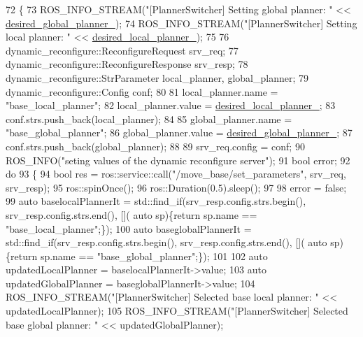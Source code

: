 \begin{DoxyCode}
72 \{
73   ROS\_INFO\_STREAM(\textcolor{stringliteral}{"[PlannerSwitcher] Setting global planner: "} << 
      \hyperlink{classcl__move__base__z_1_1PlannerSwitcher_aef047d3778b2993c1df146bbad43e03d}{desired\_global\_planner\_});
74   ROS\_INFO\_STREAM(\textcolor{stringliteral}{"[PlannerSwitcher] Setting local planner: "} << 
      \hyperlink{classcl__move__base__z_1_1PlannerSwitcher_a6cbf65f11bb69125f913caaabdf7b4cf}{desired\_local\_planner\_});
75 
76   dynamic\_reconfigure::ReconfigureRequest srv\_req;
77   dynamic\_reconfigure::ReconfigureResponse srv\_resp;
78   dynamic\_reconfigure::StrParameter local\_planner, global\_planner;
79   dynamic\_reconfigure::Config conf;
80 
81   local\_planner.name = \textcolor{stringliteral}{"base\_local\_planner"};
82   local\_planner.value = \hyperlink{classcl__move__base__z_1_1PlannerSwitcher_a6cbf65f11bb69125f913caaabdf7b4cf}{desired\_local\_planner\_};
83   conf.strs.push\_back(local\_planner);
84 
85   global\_planner.name = \textcolor{stringliteral}{"base\_global\_planner"};
86   global\_planner.value = \hyperlink{classcl__move__base__z_1_1PlannerSwitcher_aef047d3778b2993c1df146bbad43e03d}{desired\_global\_planner\_};
87   conf.strs.push\_back(global\_planner);
88 
89   srv\_req.config = conf;
90   ROS\_INFO(\textcolor{stringliteral}{"seting values of the dynamic reconfigure server"});
91   \textcolor{keywordtype}{bool} error;
92   \textcolor{keywordflow}{do}
93   \{
94     \textcolor{keywordtype}{bool} res = ros::service::call(\textcolor{stringliteral}{"/move\_base/set\_parameters"}, srv\_req, srv\_resp);
95     ros::spinOnce();
96     ros::Duration(0.5).sleep();
97     
98     error = \textcolor{keyword}{false};
99     \textcolor{keyword}{auto} baselocalPlannerIt = std::find\_if(srv\_resp.config.strs.begin(), srv\_resp.config.strs.end(), [](\textcolor{keyword}{
      auto} sp)\{\textcolor{keywordflow}{return} sp.name == \textcolor{stringliteral}{"base\_local\_planner"};\});
100     \textcolor{keyword}{auto} baseglobalPlannerIt = std::find\_if(srv\_resp.config.strs.begin(), srv\_resp.config.strs.end(), [](\textcolor{keyword}{
      auto} sp)\{\textcolor{keywordflow}{return} sp.name == \textcolor{stringliteral}{"base\_global\_planner"};\});
101 
102     \textcolor{keyword}{auto} updatedLocalPlanner = baselocalPlannerIt->value;
103     \textcolor{keyword}{auto} updatedGlobalPlanner = baseglobalPlannerIt->value;
104     ROS\_INFO\_STREAM(\textcolor{stringliteral}{"[PlannerSwitcher] Selected base local planner: "} << updatedLocalPlanner);
105     ROS\_INFO\_STREAM(\textcolor{stringliteral}{"[PlannerSwitcher] Selected base global planner: "} << updatedGlobalPlanner);

\end{DoxyCode}
